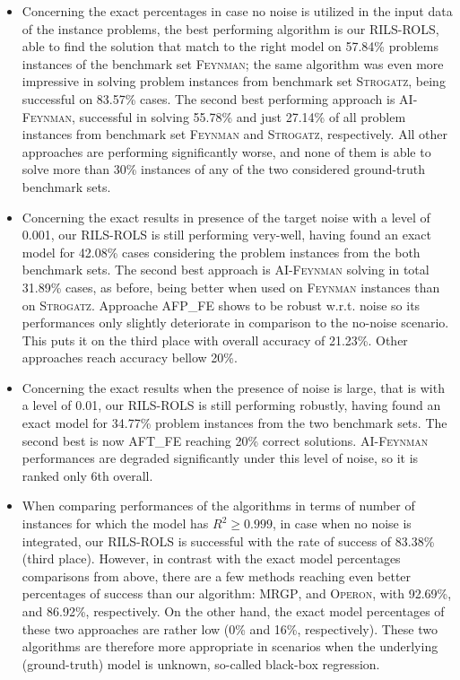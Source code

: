 \documentclass[a4paper,12pt]{elsarticle}
\begin{document}
\begin{itemize}
	\item Concerning the exact percentages in case no noise is utilized in the input data of the instance problems, the best performing algorithm is our \textsc{RILS-ROLS}, able to find the solution that match to the right model on 57.84\% problems instances of the benchmark set \textsc{Feynman}; the same algorithm was even more impressive in solving problem instances from benchmark set \textsc{Strogatz}, being successful on 83.57\% cases. The second best performing  approach is \textsc{AI-Feynman}, successful in solving 55.78\% and just 27.14\% of all problem instances from benchmark set \textsc{Feynman} and \textsc{Strogatz}, respectively. All other approaches are performing significantly worse, and none of them is able to solve more than 30\% instances of any of the two considered ground-truth benchmark sets. 
	\item   Concerning the exact results in presence of the target noise with a level of 0.001, our \textsc{RILS-ROLS} is still performing very-well, having found an exact model for 42.08\% cases considering the problem instances from the both benchmark sets. The second best approach is \textsc{AI-Feynman} solving in total 31.89\% cases, as before, being better when used on \textsc{Feynman} instances than on \textsc{Strogatz}. Approache \textsc{AFP\_FE} shows to be robust w.r.t. noise so its performances only slightly deteriorate in comparison to the no-noise scenario. This puts it on the third place with overall accuracy of 21.23\%. Other approaches reach accuracy bellow 20\%. 
	\item  Concerning the exact results when the presence of noise is large, that is with a level of 0.01,  our \textsc{RILS-ROLS} is still performing robustly, having found an exact model for  34.77\% problem instances from the two benchmark sets. The second best is now \textsc{AFT\_FE} reaching 20\% correct solutions. \textsc{AI-Feynman} performances are degraded significantly under this level of noise, so it is ranked only 6th overall.  
	
	\item When comparing performances of the algorithms in terms of number of instances for which the model has $R^2 \geq 0.999$, in case when no noise is integrated, our \textsc{RILS}-\textsc{ROLS} is successful with the rate of success of 83.38\% (third place). However, in contrast with the exact model percentages comparisons from above, there are a few methods reaching even better percentages of success than our algorithm: \textsc{MRGP}, and \textsc{Operon}, with 92.69\%, and 86.92\%, respectively. On the other hand, the exact model percentages of these two approaches are rather low (0\% and 16\%, respectively). These two algorithms are therefore more appropriate in scenarios when the underlying (ground-truth) model is unknown, so-called black-box regression. 
	

\end{itemize}
\end{document}
